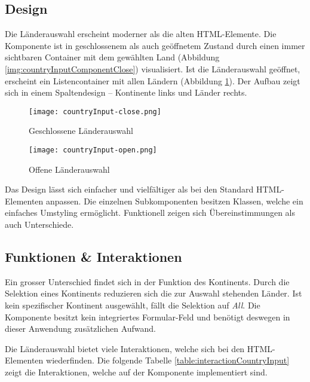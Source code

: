 \subsection{Design}
\label{sec:countryChoiceDesign}

Die Länderauswahl erscheint moderner als die alten HTML-Elemente.
Die Komponente ist in geschlossenem als auch geöffnetem Zustand durch einen immer sichtbaren Container mit dem gewählten Land (Abbildung \ref{img:countryInputComponentClose}) visualisiert.
Ist die Länderauswahl geöffnet, erscheint ein Listencontainer mit allen Ländern (Abbildung \ref{img:countryInputComponentOpen}).
Der Aufbau zeigt sich in einem Spaltendesign – Kontinente links und Länder rechts.

\begin{figure}[!htb]
    \centering
    \begin{minipage}[b]{0.5\textwidth}
        \centering
        \texttt{[image: countryInput-close.png]}
        \caption{Geschlossene Länderauswahl}
        \label{img:countryInputComponentClose}
    \end{minipage}
    \hfill
    \begin{minipage}[b]{0.45\textwidth}
        \centering
        \texttt{[image: countryInput-open.png]}
        \caption{Offene Länderauswahl}
        \label{img:countryInputComponentOpen}
    \end{minipage}
\end{figure}

Das Design lässt sich einfacher und vielfältiger als bei den Standard HTML-Elementen anpassen.
Die einzelnen Subkomponenten besitzen Klassen, welche ein einfaches Umstyling ermöglicht.
Funktionell zeigen sich Übereinstimmungen als auch Unterschiede.


\subsection{Funktionen \& Interaktionen}
\label{sec:countryChoiceFunction}

Ein grosser Unterschied findet sich in der Funktion des Kontinents.
Durch die Selektion eines Kontinents reduzieren sich die zur Auswahl stehenden Länder.
Ist kein spezifischer Kontinent ausgewählt, fällt die Selektion auf \emph{All}.
Die Komponente besitzt kein integriertes Formular-Feld und benötigt deswegen in dieser Anwendung zusätzlichen Aufwand.

Die Länderauswahl bietet viele Interaktionen, welche sich bei den HTML-Elementen wiederfinden.
Die folgende Tabelle \ref{table:interactionCountryInput} zeigt die Interaktionen, welche auf der Komponente implementiert sind.

